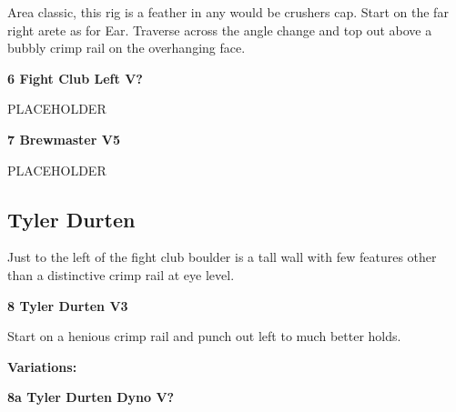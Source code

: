 \begin{multicols}{2}
\begin{minipage}{\linewidth}
					\begin{adjustwidth}{0.5cm}{}				
					Area classic, this rig is a feather in any would be crushers cap. Start on the far right arete as for Ear. Traverse across the angle change and top out above a bubbly crimp rail on the overhanging face.
					\end{adjustwidth}
					\end{minipage}
					\begin{minipage}{\linewidth}	
					\label{rt:Fight Club Left}
\colorbox{black!20}{
\parbox{0.95\textwidth}{
\textbf{
6 Fight Club Left V?  
}
}
}

					\begin{adjustwidth}{0.5cm}{}				
					PLACEHOLDER
					\end{adjustwidth}
					\end{minipage}
					\begin{minipage}{\linewidth}	
					\label{rt:Brewmaster}
\colorbox{RoyalBlue!20}{
\parbox{0.95\textwidth}{
\textbf{
7 Brewmaster V5    
}
}
}

					\begin{adjustwidth}{0.5cm}{}				
					PLACEHOLDER
					\end{adjustwidth}
					\end{minipage}
			\subsection*{Tyler Durten}\label{bf:Tyler Durten}
			\begin{minipage}{\columnwidth}
			Just to the left of the fight club boulder is a tall wall with few features other than a distinctive crimp rail at eye level.
			\end{minipage}
			
					\begin{minipage}{\linewidth}	
					\label{rt:Tyler Durten}
\colorbox{green!20}{
\parbox{0.95\textwidth}{
\textbf{
8 Tyler Durten V3   
}
}
}

					\begin{adjustwidth}{0.5cm}{}				
					Start on a henious crimp rail and punch out left to much better holds.
					\end{adjustwidth}
					\end{minipage}
						\begin{adjustwidth}{0.5cm}{}				
						\textbf{Variations:} \newline
							\begin{minipage}{\linewidth}	
							\label{vr:Tyler Durten Dyno}
\colorbox{black!20}{
\parbox{0.95\textwidth}{
\textbf{
8a Tyler Durten Dyno V?  
}
}
}


\end{minipage}
\end{adjustwidth}
\end{multicols}
